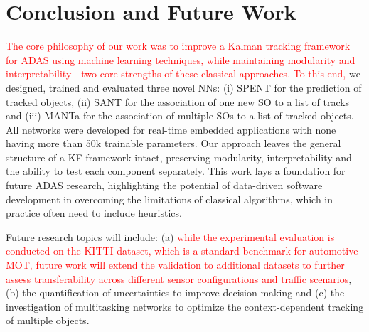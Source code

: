 \documentclass[letterpaper, 10 pt, journal, twoside]{IEEEtran}
\newcommand{\red}[1]{\textcolor{red}{#1}}
\begin{document}
\section{Conclusion and Future Work}
\red{The core philosophy of our work was to improve a Kalman tracking framework for \ac{ADAS} using machine learning techniques, while maintaining modularity and interpretability—two core strengths of these classical approaches. To this end,} we designed, trained and evaluated three novel \ac{NN}s: (i) SPENT for the prediction of tracked objects, (ii) SANT for the association of one new \ac{SO} to a list of tracks and (iii) MANTa for the association of multiple SOs to a list of tracked objects. All networks were developed for real-time embedded applications with none having more than 50k trainable parameters.
Our approach leaves the general structure of a \ac{KF} framework intact, preserving modularity, interpretability and the ability to test each component separately. This work lays a foundation for future \ac{ADAS} research, highlighting the potential of data-driven software development in overcoming the limitations of classical algorithms, which in practice often need to include heuristics.

Future research topics will include: (a) \red{while the experimental evaluation is conducted on the KITTI dataset, which is a standard benchmark for automotive \ac{MOT}, future work will extend the validation to additional datasets to further assess transferability across different sensor configurations and traffic scenarios}, (b) the quantification of uncertainties to improve decision making and (c) the investigation of multitasking networks to optimize the context-dependent tracking of multiple objects.
\end{document}
